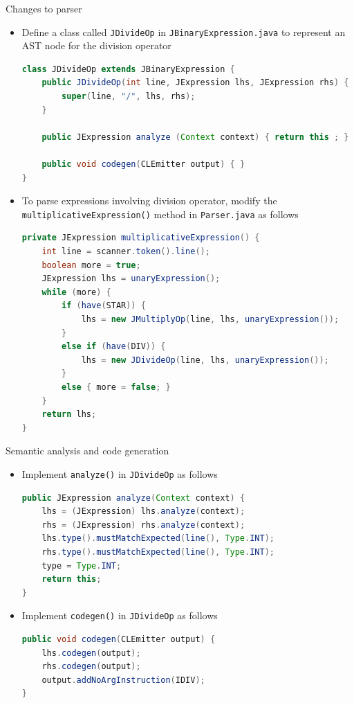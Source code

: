 \documentclass[8pt,a4paper,compress]{beamer}
\begin{document}
\begin{frame}[fragile]
\pause

Changes to parser
\begin{itemize}
\item Define a class called \lstinline{JDivideOp} in \lstinline{JBinaryExpression.java} to represent an AST node for the division operator

\begin{lstlisting}[language=Java]
class JDivideOp extends JBinaryExpression {
    public JDivideOp(int line, JExpression lhs, JExpression rhs) {
        super(line, "/", lhs, rhs);
    }
    
    public JExpression analyze (Context context) { return this ; }
    
    public void codegen(CLEmitter output) { }
}
\end{lstlisting}

\item To parse expressions involving division operator, modify the \lstinline{multiplicativeExpression()} method in \lstinline{Parser.java} as follows

\begin{lstlisting}[language=Java]
private JExpression multiplicativeExpression() {
    int line = scanner.token().line();
    boolean more = true;
    JExpression lhs = unaryExpression();
    while (more) {
        if (have(STAR)) {
            lhs = new JMultiplyOp(line, lhs, unaryExpression());
        }
        else if (have(DIV)) {
            lhs = new JDivideOp(line, lhs, unaryExpression());
        }
        else { more = false; }
    }
    return lhs;
}
\end{lstlisting}
\end{itemize}
\end{frame}

\begin{frame}[fragile]
\pause

Semantic analysis and code generation
\begin{itemize}
\item Implement \lstinline{analyze()} in \lstinline{JDivideOp} as follows

\begin{lstlisting}[language=Java]
public JExpression analyze(Context context) {
    lhs = (JExpression) lhs.analyze(context);
    rhs = (JExpression) rhs.analyze(context);
    lhs.type().mustMatchExpected(line(), Type.INT);
    rhs.type().mustMatchExpected(line(), Type.INT);
    type = Type.INT;
    return this;
}
\end{lstlisting}

\item Implement \lstinline{codegen()} in \lstinline{JDivideOp} as follows

\begin{lstlisting}[language=Java]
public void codegen(CLEmitter output) {
    lhs.codegen(output);
    rhs.codegen(output);
    output.addNoArgInstruction(IDIV);
}
\end{lstlisting}
\end{itemize}
\end{frame}
\end{document}
